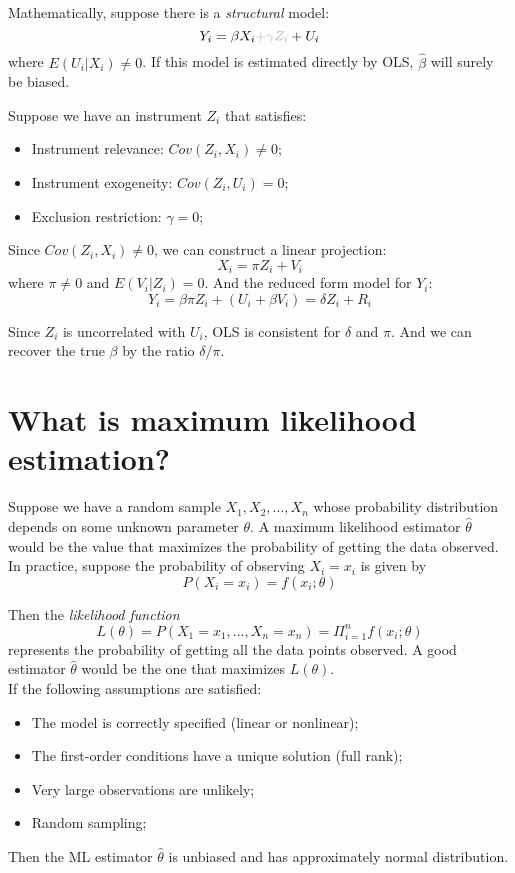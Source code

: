\documentclass[%
 aip,
 jmp,%
 amsmath,amssymb,
 reprint,%
]{revtex4-1}
\newcommand{\term}[1]{\emph{#1}}
\begin{document}
Mathematically, suppose there is a \emph{structural} model:
$$ Y_i = \beta X_i  {\color{lightgray}+\gamma Z_i} + U_i $$
where $E(U_i|X_i) \neq 0$. If this model is estimated directly by OLS, $\hat{\beta}$ will surely be biased.

Suppose we have an instrument $Z_i$ that satisfies:
    \begin{itemize}
        \item Instrument relevance: $Cov(Z_i, X_i) \neq 0$;
        \item Instrument exogeneity: $Cov(Z_i, U_i) = 0$;
        \item Exclusion restriction: $\gamma = 0$;
    \end{itemize}

Since $Cov(Z_i, X_i) \neq 0$, we can construct a linear projection:
$$ X_i = \pi Z_i + V_i $$
where $\pi \neq 0$ and $E(V_i|Z_i) = 0$. And the reduced form model for $Y_i$:
$$ Y_i = \beta \pi Z_i + (U_i + \beta V_i) = \delta Z_i + R_i $$

Since $Z_i$ is uncorrelated with $U_i$, OLS is consistent for $\delta$ and $\pi$.
And we can recover the true $\beta$ by the ratio $\delta / \pi$. \\


\section*{What is maximum likelihood estimation?}

Suppose we have a random sample $X_1, X_2, \dots, X_n$ whose probability distribution depends on some 
unknown parameter $\theta$. A maximum likelihood estimator $\hat{\theta}$ would be the value that maximizes 
the probability of getting the data observed. \\

In practice, suppose the probability of observing $X_i = x_i$ is given by
$$ P(X_i = x_i) = f(x_i; \theta) $$

Then the \term{likelihood function}
$$ L(\theta) = P(X_1=x_1, \dots, X_n=x_n) = \Pi_{i=1}^{n} f(x_i; \theta) $$
represents the probability of getting all the data points observed. 
A good estimator $\hat{\theta}$ would be the one that maximizes $L(\theta)$. \\

If the following assumptions are satisfied:
    \begin{itemize}
        \item The model is correctly specified (linear or nonlinear);
        \item The first-order conditions have a unique solution (full rank);
        \item Very large observations are unlikely;
        \item Random sampling;
    \end{itemize}
Then the ML estimator $\hat{\theta}$ is unbiased and has approximately normal distribution.\\
\end{document}
